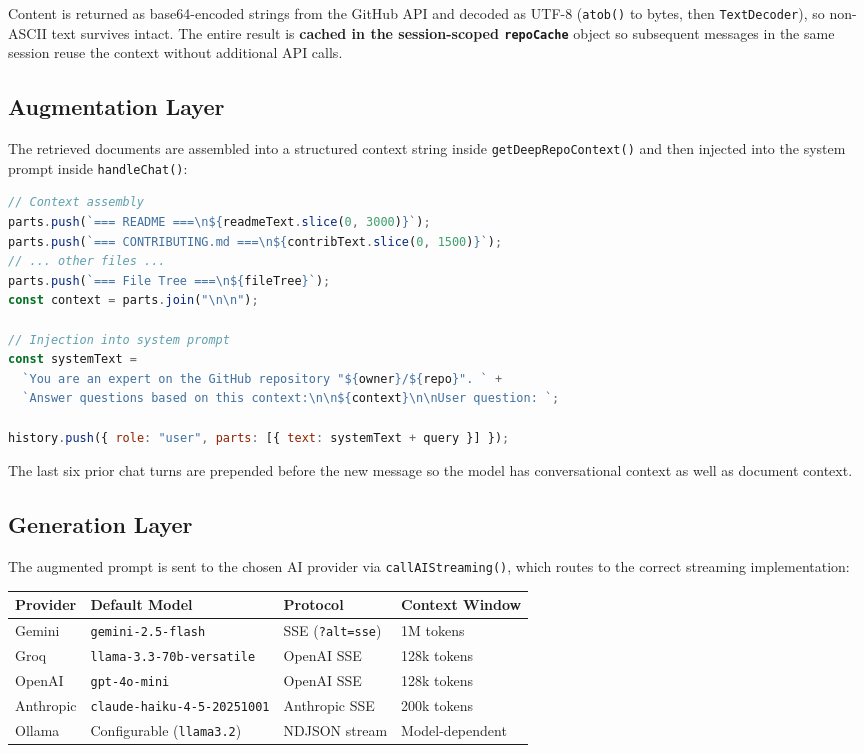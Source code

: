 \documentclass[11pt,a4paper]{article}
\begin{document}
Content is returned as base64-encoded strings from the GitHub API and decoded as UTF-8 (\texttt{atob()} to bytes, then \texttt{TextDecoder}), so non-ASCII text survives intact. The entire result is \textbf{cached in the session-scoped \texttt{repoCache}} object so subsequent messages in the same session reuse the context without additional API calls.

\subsection{Augmentation Layer}

The retrieved documents are assembled into a structured context string inside \texttt{getDeepRepoContext()} and then injected into the system prompt inside \texttt{handleChat()}:

\begin{lstlisting}[language=JavaScript]
// Context assembly
parts.push(`=== README ===\n${readmeText.slice(0, 3000)}`);
parts.push(`=== CONTRIBUTING.md ===\n${contribText.slice(0, 1500)}`);
// ... other files ...
parts.push(`=== File Tree ===\n${fileTree}`);
const context = parts.join("\n\n");

// Injection into system prompt
const systemText =
  `You are an expert on the GitHub repository "${owner}/${repo}". ` +
  `Answer questions based on this context:\n\n${context}\n\nUser question: `;

history.push({ role: "user", parts: [{ text: systemText + query }] });
\end{lstlisting}

The last six prior chat turns are prepended before the new message so the model has conversational context as well as document context.

\subsection{Generation Layer}

The augmented prompt is sent to the chosen AI provider via \texttt{callAIStreaming()}, which routes to the correct streaming implementation:

\medskip
\begin{longtable}{L{2.8cm} L{4.4cm} L{2.8cm} L{3.5cm}}
    \toprule
    \textbf{Provider} & \textbf{Default Model} & \textbf{Protocol} & \textbf{Context Window} \\
    \midrule
    \endhead
    \bottomrule
    \endfoot

    Gemini  & \texttt{gemini-2.5-flash}           & SSE (\texttt{?alt=sse}) & 1M tokens \\
    Groq    & \texttt{llama-3.3-70b-versatile}    & OpenAI SSE              & 128k tokens \\
    OpenAI  & \texttt{gpt-4o-mini}                & OpenAI SSE              & 128k tokens \\
    Anthropic & \texttt{claude-haiku-4-5-20251001} & Anthropic SSE          & 200k tokens \\
    Ollama  & Configurable (\texttt{llama3.2})    & NDJSON stream           & Model-dependent \\
\end{longtable}
\end{document}
